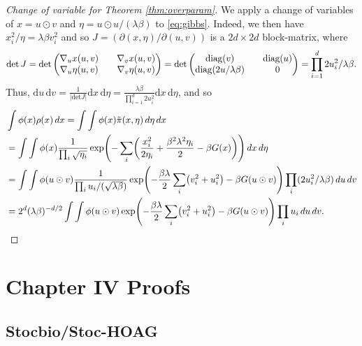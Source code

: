 \documentclass[11pt, twoside]{report}
\begin{document}
\begin{proof}[Change of variable for Theorem \ref{thm:overparam}]
We apply a change of variables of $x = u \odot v$ and $\eta = u \odot u /(\lambda \beta)$ to \eqref{eq:gibbs}. 
Indeed, we then have $x_i^2/\eta = \lambda\beta v_i^2$ and so $J = (\partial(x,\eta) / \partial(u,v))$ is a $2d \times 2d$ block-matrix, where
    $$\operatorname{det}J 
    = 
    \operatorname{det}\begin{pmatrix}
     \nabla_u x(u,v) && \nabla_v x(u,v) \\
     \nabla_u \eta(u,v) && \nabla_v \eta(u,v)
    \end{pmatrix} =\operatorname{det}\begin{pmatrix}
     \operatorname{diag}(v) && \operatorname{diag}(u) \\
     \operatorname{diag}(2u/\lambda\beta) && 0
    \end{pmatrix} = \prod_{i=1}^d 2u_i^2/\lambda\beta.$$
Thus, $\mathrm{d}u\,\mathrm{d}v = \frac{1}{|\mathrm{det}J|} \mathrm{d}
    x\,\mathrm{d}\eta = \frac{\lambda\beta}{\prod_{i=1}^d 2u_i^2} \mathrm{d}x\,\mathrm{d}\eta$, and so
\begin{align*}
    &\int \phi(x)\rho(x)\, dx = \int \int \phi(x) \tilde \pi(x,\eta)\,d\eta \,dx\\
    &=\int \int \phi(x) \frac{1}{\prod_{i} \sqrt{\eta_i}} \exp\pa{  -\sum_i \pa{ \frac{x_i^2}{2\eta_i} + \frac{\beta^2\lambda^2\eta_i}{2} -\beta G(x)} } \,dx\,d\eta\\
    &=\int \int \phi(u\odot v) \frac{1}{\prod_{i} u_i/(\sqrt{\lambda \beta})} \exp\pa{  -\frac{\beta\lambda}{2}\sum_i \pa{ v_i^2+u_i^2 } -\beta G(u\odot v) } \prod_i (2u_i^2/\lambda \beta) \,du\, dv\\
    &= 2^d (\lambda\beta)^{-d/2} \int \int \phi(u\odot v)  \exp\pa{  -\frac{\beta\lambda}{2}\sum_i \pa{  v_i^2+u_i^2 } -\beta G(u\odot v) } \prod_i u_i \,du\, dv.
\end{align*}
\end{proof}

\chapter{Chapter IV Proofs}
\label{bilevel_proofs}

\section{Stocbio/Stoc-HOAG}
\end{document}

